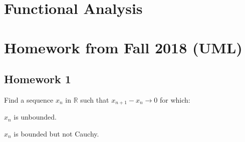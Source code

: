 \documentclass[crop=false,class=article,oneside]{standalone}
\begin{document}
    \ifx\ifmathcoursesfunctional\undefined
        \section*{Functional Analysis}
        \setcounter{section}{3}
        \renewcommand\thefigure{\arabic{section}.\arabic{figure}}
        \renewcommand\thesubfigure{%
            \arabic{section}.\arabic{figure}.\arabic{subfigure}}
    \else
        \section{Homework from Fall 2018 (UML)}
    \fi
    \subsection{Homework 1}
        \begin{problem}
            Find a sequence $x_{n}$ in $\mathbb{R}$
            such that $x_{n+1}-x_{n}\rightarrow{0}$
            for which:
            \begin{enumerate}
                \begin{multicols}{2}
                    \item $x_{n}$ is unbounded.
                    \item $x_{n}$ is bounded but
                          not Cauchy.
                \end{multicols}
            \end{enumerate}
        \end{problem}
\end{document}
